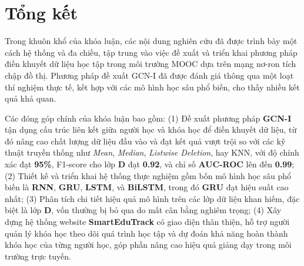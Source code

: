 

\section{Tổng kết}

Trong khuôn khổ của khóa luận, các nội dung nghiên cứu đã được trình bày một cách hệ thống và đa chiều, tập trung vào việc đề xuất và triển khai phương pháp điền khuyết dữ liệu học tập trong môi trường MOOC dựa trên mạng nơ-ron tích chập đồ thị. Phương pháp đề xuất GCN-I đã được đánh giá thông qua một loạt thí nghiệm thực tế, kết hợp với các mô hình học sâu phổ biến, cho thấy nhiều kết quả khả quan.

Các đóng góp chính của khóa luận bao gồm:
(1) Đề xuất phương pháp \textbf{GCN-I} tận dụng cấu trúc liên kết giữa người học và khóa học để điền khuyết dữ liệu, từ đó nâng cao chất lượng dữ liệu đầu vào và đạt kết quả vượt trội so với các kỹ thuật truyền thống như \textit{Mean}, \textit{Median}, \textit{Listwise Deletion}, hay KNN, với độ chính xác đạt \textbf{95\%}, F1-score cho lớp \textbf{D} đạt \textbf{0.92}, và chỉ số \textbf{AUC-ROC} lên đến \textbf{0.99};
(2) Thiết kế và triển khai hệ thống thực nghiệm gồm bốn mô hình học sâu phổ biến là \textbf{RNN}, \textbf{GRU}, \textbf{LSTM}, và \textbf{BiLSTM}, trong đó \textbf{GRU} đạt hiệu suất cao nhất;
(3) Phân tích chi tiết hiệu quả mô hình trên các lớp dữ liệu khan hiếm, đặc biệt là lớp \textbf{D}, vốn thường bị bỏ qua do mất cân bằng nghiêm trọng;
(4) Xây dựng hệ thống website \textbf{SmartEduTrack} có giao diện thân thiện, hỗ trợ người quản lý khóa học theo dõi quá trình học tập và dự đoán khả năng hoàn thành khóa học của từng người học, góp phần nâng cao hiệu quả giảng dạy trong môi trường trực tuyến.

